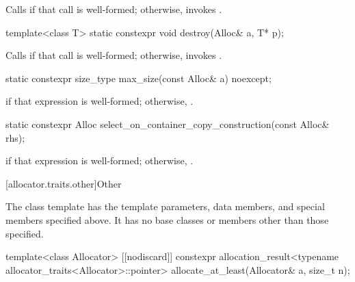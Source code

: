 \begin{itemdescr}
\pnum
\effects
Calls 
if that call is well-formed;
otherwise, invokes .
\end{itemdescr}

%
\begin{itemdecl}
template<class T>
  static constexpr void destroy(Alloc& a, T* p);
\end{itemdecl}

\begin{itemdescr}
\pnum
\effects
Calls  if that call is well-formed; otherwise, invokes
.
\end{itemdescr}

%
\begin{itemdecl}
static constexpr size_type max_size(const Alloc& a) noexcept;
\end{itemdecl}

\begin{itemdescr}
\pnum
\returns
{} if that expression is well-formed; otherwise,
.
\end{itemdescr}

%
\begin{itemdecl}
static constexpr Alloc select_on_container_copy_construction(const Alloc& rhs);
\end{itemdecl}

\begin{itemdescr}
\pnum
\returns
{} if that expression is
well-formed; otherwise, .
\end{itemdescr}

[allocator.traits.other]{Other}

\pnum
The class template  has
the template parameters, data members, and special members specified above.
It has no base classes or members other than those specified.

\begin{itemdecl}
template<class Allocator>
[[nodiscard]] constexpr allocation_result<typename allocator_traits<Allocator>::pointer>
  allocate_at_least(Allocator& a, size_t n);
\end{itemdecl}

